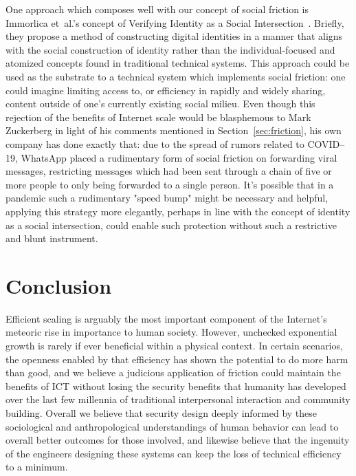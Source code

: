 \documentclass[sigconf,authordraft]{acmart}
\begin{document}
One approach which composes well with our concept of social friction is Immorlica et~al.'s concept
of Verifying Identity as a Social Intersection~\cite{immorlica2019verifying}. Briefly, they propose
a method of constructing digital identities in a manner that aligns with the social construction of
identity rather than the individual-focused and atomized concepts found in traditional technical
systems. This approach could be used as the substrate to a technical system which implements social
friction: one could imagine limiting access to, or efficiency in rapidly and widely sharing, content
outside of one's currently existing social milieu. Even though this rejection of the benefits of
Internet scale would be blasphemous to Mark Zuckerberg in light of his comments mentioned in
Section~\ref{sec:friction}, his own company has done exactly that: due to the spread of rumors
related to COVID--19, WhatsApp placed a rudimentary form of social friction on forwarding viral
messages, restricting messages which had been sent through a chain of five or more people to only
being forwarded to a single person.\cite{whatsappmassfwd} It's possible that in a pandemic such a
rudimentary "speed bump" might be necessary and helpful, applying this strategy more elegantly,
perhaps in line with the concept of identity as a social intersection, could enable such protection
without such a restrictive and blunt instrument.


\section{Conclusion}
\label{sec:concl}

Efficient scaling is arguably the most important component of the Internet's meteoric rise in
importance to human society. However, unchecked exponential growth is rarely if ever beneficial
within a physical context. In certain scenarios, the openness enabled by that efficiency has shown
the potential to do more harm than good, and we believe a judicious application of friction could
maintain the benefits of ICT without losing the security benefits that humanity has developed over
the last few millennia of traditional interpersonal interaction and community building. Overall we
believe that security design deeply informed by these sociological and anthropological
understandings of human behavior can lead to overall better outcomes for those involved, and
likewise believe that the ingenuity of the engineers designing these systems can keep the loss of
technical efficiency to a minimum.




\end{document}
